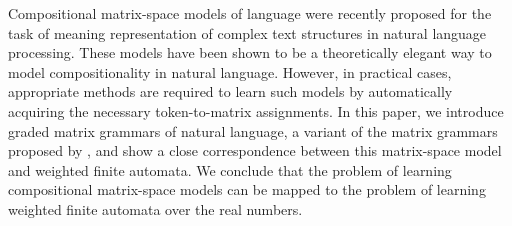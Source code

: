 Compositional matrix-space models of language were recently proposed for the task of meaning representation of complex text structures in natural language processing. These models have been shown to be a theoretically elegant way to model compositionality in natural language. However, in practical cases, appropriate methods are required to learn such models by automatically acquiring the necessary token-to-matrix assignments. In this paper, we introduce graded matrix grammars of natural language, a variant of the matrix grammars proposed by , and show a close correspondence between this matrix-space model and weighted finite automata. We conclude that the problem of learning compositional matrix-space models can be mapped to the problem of learning weighted finite automata over the real numbers.
